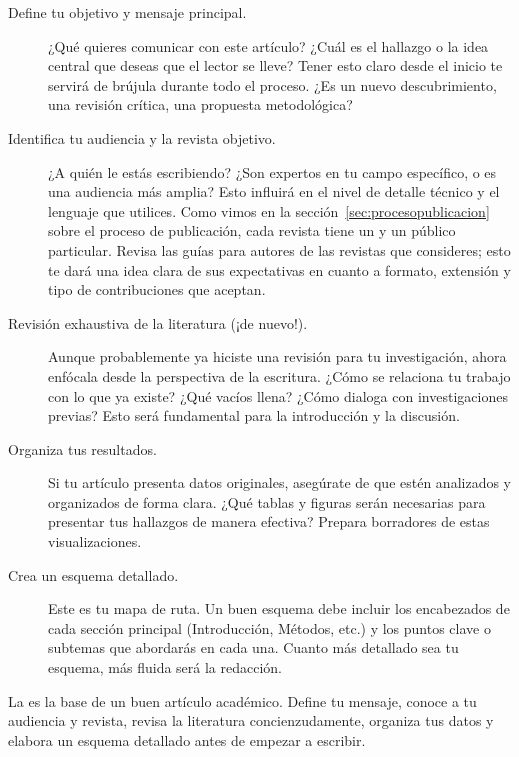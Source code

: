 \begin{description}
  \item[Define tu objetivo y mensaje principal.] ¿Qué quieres comunicar con
    este artículo? ¿Cuál es el hallazgo o la idea central que deseas que
    el lector se lleve?
    Tener esto claro desde el inicio te servirá de brújula durante todo el
    proceso.
    ¿Es un nuevo descubrimiento, una revisión crítica, una propuesta metodológica?

  \item[Identifica tu audiencia y la revista objetivo.] ¿A quién le estás
    escribiendo? ¿Son expertos en tu campo específico, o es una audiencia
    más amplia?
    Esto influirá en el nivel de detalle técnico y el lenguaje que utilices.
    Como vimos en la sección~\ref{sec:procesopublicacion} sobre el proceso
    de publicación, cada revista tiene un 
    y un público particular.
    Revisa las guías para autores de las revistas que consideres; esto te
    dará una idea clara de sus expectativas en cuanto a formato, extensión y
    tipo de contribuciones que aceptan.

  \item[Revisión exhaustiva de la literatura (¡de nuevo!).] Aunque
    probablemente ya hiciste una revisión para tu investigación, ahora
    enfócala desde la perspectiva de la escritura.
    ¿Cómo se relaciona tu trabajo con lo que ya existe?
    ¿Qué vacíos llena? ¿Cómo dialoga con investigaciones previas?
    Esto será fundamental para la introducción y la discusión.

  \item[Organiza tus resultados.] Si tu artículo presenta datos originales,
    asegúrate de que estén analizados y organizados de forma clara.
    ¿Qué tablas y figuras serán necesarias para presentar tus hallazgos de
    manera efectiva? Prepara borradores de estas visualizaciones.

  \item[Crea un esquema detallado.] Este es tu mapa de ruta.
    Un buen esquema debe incluir los encabezados de cada sección principal
    (Introducción, Métodos, etc.) y los puntos clave o subtemas que
    abordarás en cada una.
    Cuanto más detallado sea tu esquema, más fluida será la redacción.
\end{description}

\begin{remember}
  \label{rem:planificacionarticulo}
  La  es la base de un buen artículo académico.
  Define tu mensaje, conoce a tu audiencia y revista, revisa la literatura
  concienzudamente, organiza tus datos y elabora un esquema detallado antes
  de empezar a escribir.
\end{remember}

